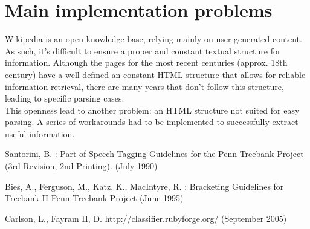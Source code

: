 \documentclass{llncs}
\begin{document}
\section{Main implementation problems}

Wikipedia is an open knowledge base, relying mainly on user generated content. As such, it's difficult to ensure a proper and constant textual structure for information. Although the pages for the most recent centuries (approx. 18th century) have a well defined an constant HTML structure that allows for reliable information retrieval, there are many years that don't follow this structure, leading to specific parsing cases.\\

This openness lead to another problem: an HTML structure not suited for easy parsing. A series of workarounds had to be implemented to successfully extract useful information.

%
%
\begin{thebibliography}{}
%
Santorini, B. :
Part-of-Speech Tagging Guidelines for the
Penn Treebank Project (3rd Revision, 2nd Printing).
(July 1990)

Bies, A., Ferguson, M., Katz, K., MacIntyre, R. :
Bracketing Guidelines for Treebank II
Penn Treebank Project
(June 1995)

Carlson, L., Fayram II, D.
http://classifier.rubyforge.org/
(September 2005)

\end{thebibliography}
\end{document}
